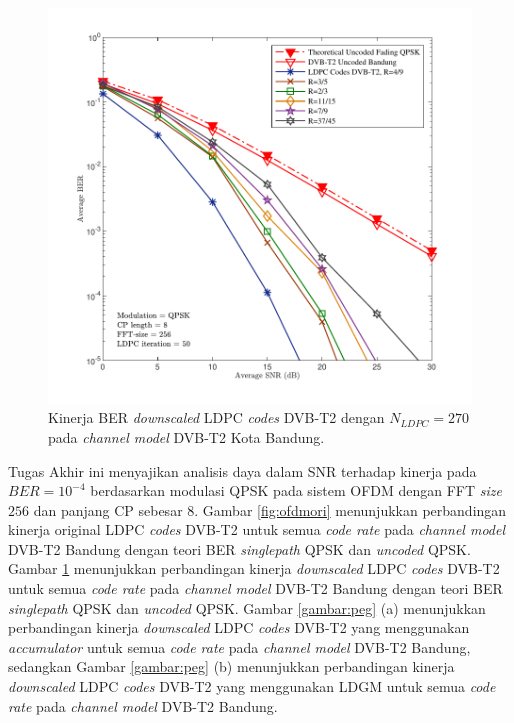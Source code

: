 \begin{figure}[b!]
	\centering
	\includegraphics[width=1\textwidth]
	{hasilOFDMdsfix2.pdf}
	\caption{Kinerja BER \textit{downscaled} LDPC \textit{codes} DVB-T2 dengan $N_{LDPC}=270$ pada \textit{channel model} DVB-T2 Kota Bandung.}
	\label{fig:ofdmds}
\end{figure}

 Tugas Akhir ini menyajikan analisis daya dalam SNR terhadap kinerja pada $BER=10^{-4}$ berdasarkan modulasi QPSK pada sistem OFDM dengan FFT \textit{size} $256$ dan panjang CP sebesar $8$. Gambar \ref{fig:ofdmori} menunjukkan perbandingan kinerja original LDPC \textit{codes} DVB-T2 untuk semua \textit{code rate} pada \textit{channel model} DVB-T2 Bandung dengan teori BER \textit{singlepath} QPSK dan \textit{uncoded} QPSK. Gambar \ref{fig:ofdmds} menunjukkan perbandingan kinerja \textit{downscaled} LDPC \textit{codes} DVB-T2 untuk semua \textit{code rate} pada \textit{channel model} DVB-T2 Bandung dengan teori BER \textit{singlepath} QPSK dan \textit{uncoded} QPSK. Gambar \ref{gambar:peg} (a) menunjukkan perbandingan kinerja \textit{downscaled} LDPC \textit{codes} DVB-T2 yang menggunakan \textit{accumulator} untuk semua \textit{code rate} pada \textit{channel model} DVB-T2 Bandung, sedangkan Gambar \ref{gambar:peg} (b) menunjukkan perbandingan kinerja \textit{downscaled} LDPC \textit{codes} DVB-T2 yang menggunakan LDGM untuk semua \textit{code rate} pada \textit{channel model} DVB-T2 Bandung.

